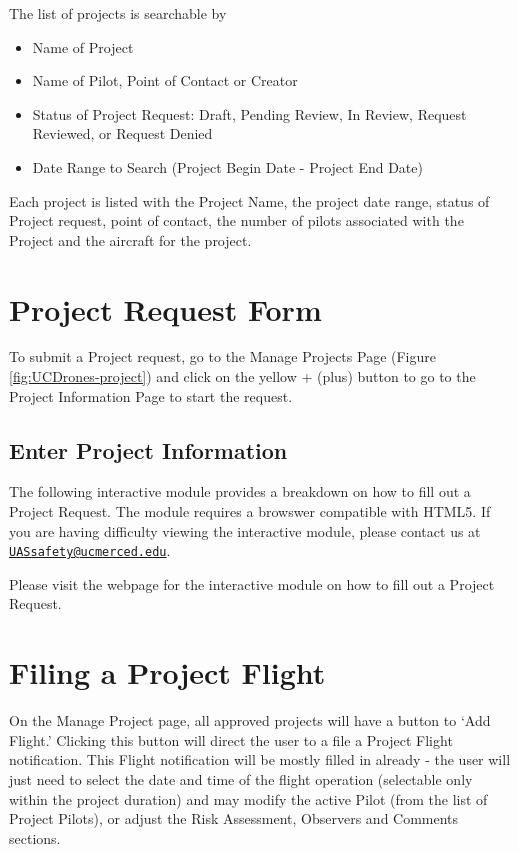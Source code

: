 \documentclass[
]{book}
\providecommand{\tightlist}{%
  \setlength{\itemsep}{0pt}\setlength{\parskip}{0pt}}
\begin{document}
The list of projects is searchable by

\begin{itemize}
\tightlist
\item
  Name of Project
\item
  Name of Pilot, Point of Contact or Creator
\item
  Status of Project Request: Draft, Pending Review, In Review, Request Reviewed, or Request Denied
\item
  Date Range to Search (Project Begin Date - Project End Date)
\end{itemize}

Each project is listed with the Project Name, the project date range, status of Project request, point of contact, the number of pilots associated with the Project and the aircraft for the project.

\hypertarget{project-request-form}{%
\section{Project Request Form}\label{project-request-form}}

To submit a Project request, go to the Manage Projects Page (Figure \ref{fig:UCDrones-project}) and click on the yellow + (plus) button to go to the Project Information Page to start the request.

\hypertarget{enter-project-information}{%
\subsection{Enter Project Information}\label{enter-project-information}}

The following interactive module provides a breakdown on how to fill out a Project Request. The module requires a browswer compatible with HTML5. If you are having difficulty viewing the interactive module, please contact us at \href{mailto:UASsafety@ucmerced.edu}{\nolinkurl{UASsafety@ucmerced.edu}}.

Please visit the webpage for the interactive module on how to fill out a Project Request.

\hypertarget{filing-a-project-flight}{%
\section{Filing a Project Flight}\label{filing-a-project-flight}}

On the Manage Project page, all approved projects will have a button to `Add Flight.' Clicking this button will direct the user to a file a Project Flight notification. This Flight notification will be mostly filled in already - the user will just need to select the date and time of the flight operation (selectable only within the project duration) and may modify the active Pilot (from the list of Project Pilots), or adjust the Risk Assessment, Observers and Comments sections.
\end{document}
